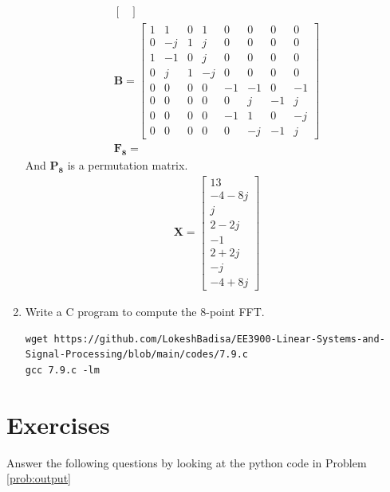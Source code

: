 \documentclass[journal,12pt,twocolumn]{IEEEtran}
\let\vec\mathbf
\numberwithin{equation}{section}
\renewcommand\thesection{\arabic{section}}
\begin{document}
\begin{enumerate}[label=\arabic*.,ref=\thesection.\theenumi]
\begin{align}
\begin{bmatrix}
\end{bmatrix}\\ \vec{B}=\begin{bmatrix}
1&1&0&1&0&0&0&0\\0&-j&1&j&0&0&0&0\\1&-1&0&j&0&0&0&0\\0&j&1&-j&0&0&0&0\\0&0&0&0&-1&-1&0&-1\\0&0&0&0&0&j&-1&j\\0&0&0&0&-1&1&0&-j\\0&0&0&0&0&-j&-1&j
\end{bmatrix}\\
\vec{F_8}=\
\end{align}
And $\vec{P_8}$ is a permutation matrix.
\begin{align}
\vec{X}=\begin{bmatrix}
 13\\-4-8j\\j\\ 2-2j\\ -1\\ 2+2j\\ -j\\ -4+8j
\end{bmatrix}
\end{align}
\item Write a C program to compute the 8-point FFT.
\begin{lstlisting} 
wget https://github.com/LokeshBadisa/EE3900-Linear-Systems-and-Signal-Processing/blob/main/codes/7.9.c
gcc 7.9.c -lm
\end{lstlisting}
 \end{enumerate}
	\section{Exercises}
	Answer the following questions by looking at the python code in Problem \ref{prob:output}
	
\end{document}
